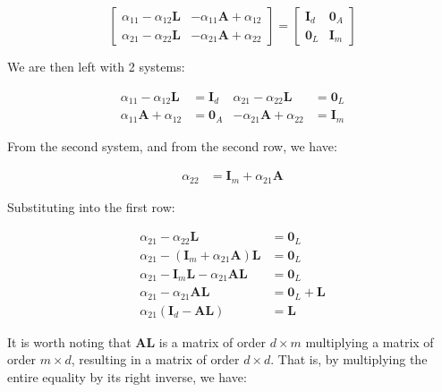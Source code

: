 \begin{equation}
\left[\begin{array}{cc}
\alpha_{11}-\alpha_{12}\boldsymbol{L} & -\alpha_{11}\boldsymbol{A}+\alpha_{12}\\
\alpha_{21}-\alpha_{22}\boldsymbol{L} & -\alpha_{21}\boldsymbol{A}+\alpha_{22}
\end{array}\right]=\left[\begin{array}{cc}
\boldsymbol{I}_{d} & \boldsymbol{0}_{A}\\
\boldsymbol{0}_{L} & \boldsymbol{I}_{m}
\end{array}\right]
\end{equation}

We are then left with 2 systems:


\begin{align}
\alpha_{11}-\alpha_{12}\boldsymbol{L} & =\boldsymbol{I}_{d} & \alpha_{21}-\alpha_{22}\boldsymbol{L} & =\boldsymbol{0}_{L}\\
\alpha_{11}\boldsymbol{A}+\alpha_{12} & =\boldsymbol{0}_{A} & -\alpha_{21}\boldsymbol{A}+\alpha_{22} & =\boldsymbol{I}_{m}
\end{align}

From the second system, and from the second row, we have:


\begin{align}
\alpha_{22} & =\boldsymbol{I}_{m}+\alpha_{21}\boldsymbol{A}
\end{align}

Substituting into the first row:


\begin{align}
\alpha_{21}-\alpha_{22}\boldsymbol{L} & =\boldsymbol{0}_{L}\\
\alpha_{21}-\left(\boldsymbol{I}_{m}+\alpha_{21}\boldsymbol{A}\right)\boldsymbol{L} & =\boldsymbol{0}_{L}\\
\alpha_{21}-\boldsymbol{I}_{m}\boldsymbol{L}-\alpha_{21}\boldsymbol{A}\boldsymbol{L} & =\boldsymbol{0}_{L}\\
\alpha_{21}-\alpha_{21}\boldsymbol{A}\boldsymbol{L} & =\boldsymbol{0}_{L}+\boldsymbol{L}\\
\alpha_{21}\left(\boldsymbol{I}_{d}-\boldsymbol{A}\boldsymbol{L}\right) & =\boldsymbol{L}
\end{align}

It is worth noting that $\boldsymbol{AL}$ is a matrix of order $d\times m$ multiplying a matrix of order $m\times d$, resulting in a matrix of order $d\times d$. That is, by multiplying the entire equality by its right inverse, we have:


